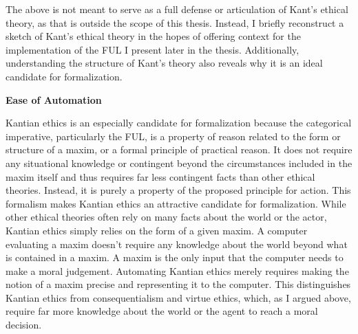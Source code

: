 \begin{isabellebody}
\begin{isamarkuptext}
The above is not meant to serve as a full defense or articulation of Kant's ethical theory, as that is outside the scope
of this thesis. Instead, I briefly reconstruct a sketch of Kant's ethical theory in the hopes 
of offering context for the implementation of the FUL I present later in the thesis. Additionally, understanding 
the structure of Kant's theory also reveals why it is an ideal candidate 
for formalization.%
\end{isamarkuptext}\isamarkuptrue%
%
\begin{isamarkuptext}%
\noindent \textbf{Ease of Automation}%
\end{isamarkuptext}\isamarkuptrue%
%
\begin{isamarkuptext}%
Kantian ethics is an especially candidate for formalization because the categorical imperative, particularly the FUL, 
is a property of reason related to the form or structure of a maxim, or a formal principle of practical
reason. It does not require any situational knowledge or contingent beyond the circumstances included
in the maxim itself and thus requires far less contingent facts than other ethical theories.
Instead, it is purely a property of the proposed principle for action. This formalism makes Kantian
ethics an attractive candidate for formalization. While other ethical theories often rely on many facts about 
the world or the actor, Kantian ethics simply relies on the form of a given maxim. A computer evaluating 
a maxim doesn't require any knowledge about the world beyond what is contained in a maxim. A maxim 
is the only input that the computer needs to make a moral judgement. Automating 
Kantian ethics merely requires making the notion of a maxim precise and representing it to the computer. 
This distinguishes Kantian ethics from consequentialism and virtue ethics, which, as I argued above, 
require far more knowledge about the world or the agent to reach a moral decision.


\end{isamarkuptext}
\end{isabellebody}
